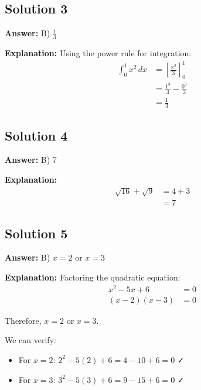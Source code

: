 \documentclass[12pt]{article}
\begin{document}
\subsection*{Solution 3}
\textbf{Answer:} B) $\frac{1}{3}$

\textbf{Explanation:}
Using the power rule for integration:
\begin{align*}
    \int_0^1 x^2 \, dx &= \left[\frac{x^3}{3}\right]_0^1 \\
    &= \frac{1^3}{3} - \frac{0^3}{3} \\
    &= \frac{1}{3}
\end{align*}

\subsection*{Solution 4}
\textbf{Answer:} B) $7$

\textbf{Explanation:}
\begin{align*}
    \sqrt{16} + \sqrt{9} &= 4 + 3 \\
    &= 7
\end{align*}

\subsection*{Solution 5}
\textbf{Answer:} B) $x = 2$ or $x = 3$

\textbf{Explanation:}
Factoring the quadratic equation:
\begin{align*}
    x^2 - 5x + 6 &= 0 \\
    (x - 2)(x - 3) &= 0
\end{align*}

Therefore, $x = 2$ or $x = 3$.

We can verify:
\begin{itemize}
    \item For $x = 2$: $2^2 - 5(2) + 6 = 4 - 10 + 6 = 0$ ✓
    \item For $x = 3$: $3^2 - 5(3) + 6 = 9 - 15 + 6 = 0$ ✓
\end{itemize}
\end{document}
